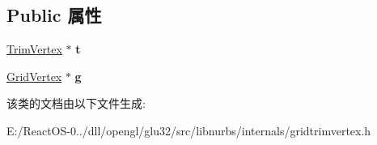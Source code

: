 \subsection*{Public 属性}
\begin{DoxyCompactItemize}
\item 
\mbox{\label{class_grid_trim_vertex_a55be4522dac9ff07e4cb4b680cbcf380}} 
\hyperlink{class_trim_vertex}{Trim\+Vertex} $\ast$ {\bfseries t}
\item 
\mbox{\label{class_grid_trim_vertex_a3b9964d2ab7eceec78e71ec099855160}} 
\hyperlink{struct_grid_vertex}{Grid\+Vertex} $\ast$ {\bfseries g}
\end{DoxyCompactItemize}


该类的文档由以下文件生成\+:\begin{DoxyCompactItemize}
\item 
E\+:/\+React\+O\+S-\/0../dll/opengl/glu32/src/libnurbs/internals/gridtrimvertex.\+h\end{DoxyCompactItemize}
